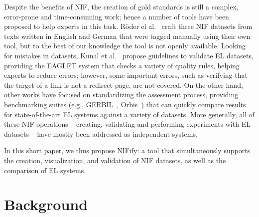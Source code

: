 \documentclass[sigconf]{acmart}
\begin{document}
Despite the benefits of NIF, the creation of gold standards is still a complex, error-prone and time-consuming work; hence a number of tools have been proposed to help experts in this task. R\"oder el al.~\cite{N3} craft three NIF datasets from texts written in English and German that were tagged manually using their own tool, but to the best of our knowledge the tool is not openly available. Looking for mistakes in datasets, Kunal et al.~\cite{Kunal2017} propose guidelines to validate EL datasets, providing the EAGLET system that checks a variety of quality rules, helping experts to reduce errors; however, some important errors, such as verifying that the target of a link is not a redirect page, are not covered. On the other hand, other works have focused on standardizing the assessment process, providing benchmarking suites (e.g., GERBIL~\cite{gerbil-2015}, Orbis~\cite{Orbis2018}) that can quickly compare results for state-of-the-art EL systems against a variety of datasets. More generally, all of these NIF operations -- creating, validating and performing experiments with EL datasets -- have mostly been addressed as independent systems. 

In this short paper, we thus propose NIFify: a tool that simultaneously supports the creation, visualization, and validation of NIF datasets, as well as the comparison of EL systems. 





\section{Background}
\label{sec:nif}
\end{document}
